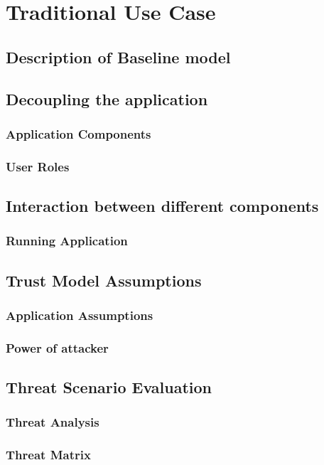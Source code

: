\chapter{Traditional Use Case}\label{C:tradtionalusecase}

\section{Description of Baseline model}

\section{Decoupling the application}
	
	\subsection{Application Components}

	\subsection{User Roles}

\section{Interaction between different components}

	\subsection{Running Application}

\section{Trust Model Assumptions}

	\subsection{Application Assumptions}

	\subsection{Power of attacker}

\section{Threat Scenario Evaluation}

	\subsection{Threat Analysis}

	\subsection{Threat Matrix}